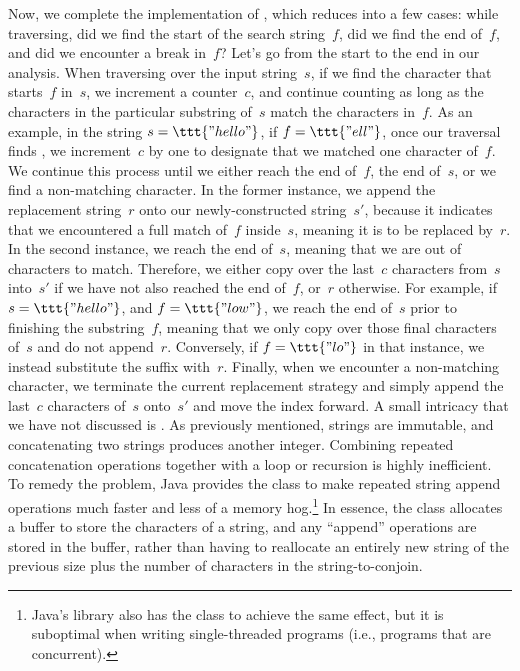 Now, we complete the implementation of , which reduces into a few cases: while traversing, did we find the start of the search string~$f$, did we find the end of~$f$, and did we encounter a break in~$f$? 
Let's go from the start to the end in our analysis. 
When traversing over the input string~$s$, if we find the character that starts~$f$ in~$s$, we increment a counter~$c$, and continue counting as long as the characters in the particular substring of~$s$ match the characters in~$f$. 
As an example, in the string $s=\ttt{"hello"}$, if $f=\ttt{"ell"}$, once our traversal finds , we increment~$c$ by one to designate that we matched one character of~$f$. 
We continue this process until we either reach the end of~$f$, the end of~$s$, or we find a non-matching character. 
In the former instance, we append the replacement string~$r$ onto our newly-constructed string~$s'$, because it indicates that we encountered a full match of~$f$ inside~$s$, meaning it is to be replaced by~$r$. 
In the second instance, we reach the end of~$s$, meaning that we are out of characters to match. 
Therefore, we either copy over the last~$c$ characters from~$s$ into~$s'$ if we have not also reached the end of~$f$, or~$r$ otherwise. 
For example, if $s=\ttt{"hello"}$, and $f=\ttt{"low"}$, we reach the end of~$s$ prior to finishing the substring~$f$, meaning that we only copy over those final characters of~$s$ and do not append~$r$. 
Conversely, if $f=\ttt{"lo"}$ in that instance, we instead substitute the suffix  with~$r$. 
Finally, when we encounter a non-matching character, we terminate the current replacement strategy and simply append the last~$c$ characters of~$s$ onto~$s'$ and move the index forward.
A small intricacy that we have not discussed is .
As previously mentioned, strings are immutable, and concatenating two strings produces another integer.
Combining repeated concatenation operations together with a loop or recursion is highly inefficient.
To remedy the problem, Java provides the  class to make repeated string append operations much faster and less of a memory hog.\footnote{Java's library also has the  class to achieve the same effect, but it is suboptimal when writing single-threaded programs (i.e., programs that are concurrent).}
In essence, the  class allocates a buffer to store the characters of a string, and any ``append'' operations are stored in the buffer, rather than having to reallocate an entirely new string of the previous size plus the number of characters in the string-to-conjoin.

